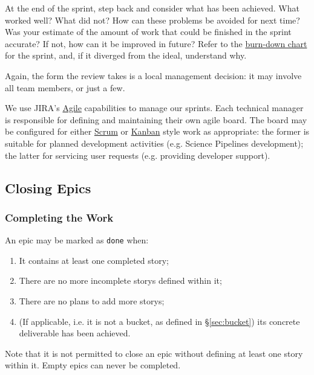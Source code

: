 \begin{enumerate}
  At the end of the sprint, step back and consider what has been
  achieved. What worked well? What did not? How can these problems be
  avoided for next time? Was your estimate of the amount of work that
  could be finished in the sprint accurate? If not, how can it be
  improved in future? Refer to the
  \href{https://en.wikipedia.org/wiki/Burn_down_chart}{burn-down chart}
  for the sprint, and, if it diverged from the ideal, understand why.

  Again, the form the review takes is a local management decision: it
  may involve all team members, or just a few.
\end{enumerate}

We use \gls{JIRA}'s
\href{https://www.atlassian.com/software/jira/agile}{Agile} capabilities
to manage our sprints. Each technical manager is responsible for
defining and maintaining their own agile board. The board may be
configured for either
\href{https://en.wikipedia.org/wiki/Scrum_(software_development)}{Scrum}
or \href{https://en.wikipedia.org/wiki/Kanban_(development)}{Kanban}
style work as appropriate: the former is suitable for planned
development activities (e.g. \gls{Science Pipelines} development); the latter
for servicing user requests (e.g. providing developer support).

\subsection{Closing Epics}
\label{sec:epic-close}

\subsubsection{Completing the Work}
\label{sec:epic-done}

An \gls{epic} may be marked as \texttt{done} when:

\begin{enumerate}
\item
  It contains at least one completed \gls{story};
\item
  There are no more incomplete \glspl{story} defined within it;
\item
  There are no plans to add more \glspl{story};
\item
  (If applicable, i.e. it is not a bucket, as defined in \S\ref{sec:bucket}) its concrete deliverable has been achieved.
\end{enumerate}

Note that it is not permitted to close an \gls{epic} without defining at least one \gls{story} within it.
Empty \glspl{epic} can never be completed.

